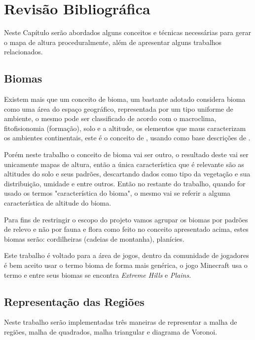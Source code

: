 \chapter{Revisão Bibliográfica}
Neste Capítulo serão abordados alguns conceitos e técnicas necessárias para
gerar o mapa de altura proceduralmente, além de apresentar alguns trabalhos
relacionados.

\section{Biomas}
Existem mais que um conceito de bioma, um bastante adotado considera bioma como
uma área do espaço geográfico, representada por um tipo uniforme de ambiente, o
mesmo pode ser classificado de acordo com o macroclima, fitofisionomia (formação),
solo e a altitude, os elementos que maus caracterizam os ambientes continentais, 
este é o conceito de \cite{coutinho2006conceito}, usando como base descrições
de \cite{walter1986vegetaccao}.

Porém neste trabalho o conceito de bioma vai ser outro, o resultado deste
vai ser unicamente mapas de altura, então a única característica que é relevante
são as altitudes do solo e seus padrões, descartando dados como tipo da
vegetação e sua distribuição, umidade e entre outros. Então no restante 
do trabalho, quando for usado os termos "característica do bioma", o mesmo vai
se referir a alguma característica de altitude do bioma.

Para fins de restringir o escopo do projeto vamos agrupar os biomas por padrões
de relevo e não por fauna e flora como feito no conceito apresentado acima,
estes biomas serão: cordilheiras (cadeias de montanha), planícies.

Este trabalho é voltado para a área de jogos, dentro da comunidade de jogadores
é bem aceito usar o termo bioma de forma mais genérica, o jogo Minecraft usa o
termo e entre seus biomas se encontra \textit{Extreme Hills} e \textit{Plains}.

\section{Representação das Regiões}
Neste trabalho serão implementadas três maneiras de representar a malha de
regiões, malha de quadrados, malha triangular e diagrama de Voronoi.

